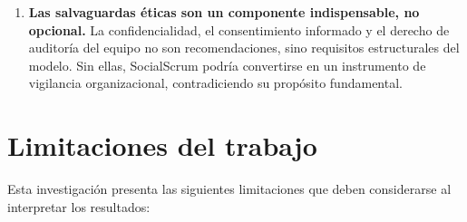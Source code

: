 \begin{enumerate}
    \item \textbf{Las salvaguardas éticas son un componente indispensable, no opcional.} La confidencialidad, el consentimiento informado y el derecho de auditoría del equipo no son recomendaciones, sino requisitos estructurales del modelo. Sin ellas, SocialScrum podría convertirse en un instrumento de vigilancia organizacional, contradiciendo su propósito fundamental.
\end{enumerate}

\section{Limitaciones del trabajo}
\label{sec:limitaciones}

Esta investigación presenta las siguientes limitaciones que deben considerarse al interpretar los resultados:

